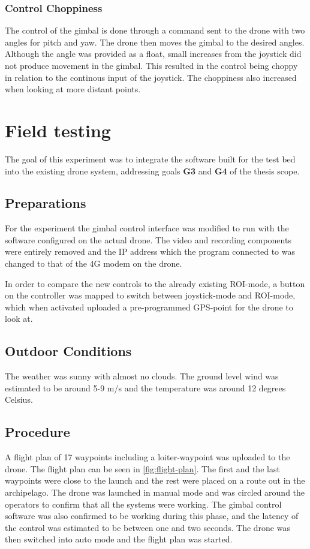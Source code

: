 \documentclass[nofilelist]{cslthse-msc}
\begin{document}
\subsubsection{Control Choppiness}
\label{sec:control-choppiness}
The control of the gimbal is done through a command sent to the drone with two angles for pitch and yaw. The drone then moves the gimbal to the desired angles. Although the angle was provided as a float, small increases from the joystick did not produce movement in the gimbal. This resulted in the control being choppy in relation to the continous input of the joystick. The choppiness also increased when looking at more distant points. 

\section{Field testing}
The goal of this experiment was to integrate the software built for the test bed into the existing drone system, addressing goals \textbf{G3} and \textbf{G4} of the thesis scope. 

\subsection{Preparations}
For the experiment the gimbal control interface was modified to run with the software configured on the actual drone. The video and recording components were entirely removed and the IP address which the program connected to was changed to that of the 4G modem on the drone.

In order to compare the new controls to the already existing ROI-mode, a button on the controller was mapped to switch between joystick-mode and ROI-mode, which when activated uploaded a pre-programmed GPS-point for the drone to look at.

\subsection{Outdoor Conditions}
The weather was sunny with almost no clouds. The ground level wind was estimated to be around 5-9 m/s and the temperature was around 12 degrees Celsius.

\subsection{Procedure}
A flight plan of 17 waypoints including a loiter-waypoint was uploaded to the drone. The flight plan can be seen in \ref{fig:flight-plan}. The first and the last waypoints were close to the launch and the rest were placed on a route out in the archipelago. The drone was launched in manual mode and was circled around the operators to confirm that all the systems were working. The gimbal control software was also confirmed to be working during this phase, and the latency of the control was estimated to be between one and two seconds. The drone was then switched into auto mode and the flight plan was started.
\end{document}
